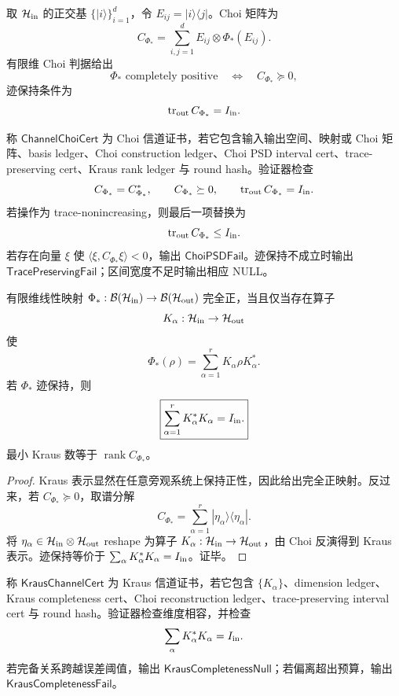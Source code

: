 取 \(\mathcal H_{\rm in}\) 的正交基 \(\{|i\rangle\}_{i=1}^d\)，令 \(E_{ij}=|i\rangle\langle j|\)。Choi 矩阵为
\[
\boxed{
C_{\Phi_{\ast}}
=
\sum_{i,j=1}^{d}
E_{ij}\otimes\Phi_{\ast}(E_{ij}).
}
\]
有限维 Choi 判据给出
\[
\Phi_{\ast}\text{ completely positive}
\quad\Longleftrightarrow\quad
C_{\Phi_{\ast}}\succeq0,
\]
迹保持条件为
\[
\operatorname{tr}_{\rm out} C_{\Phi_{\ast}}=I_{\rm in}.
\]

\begin{definition}\label{def:typed-address-biaxial-completion-channel-choi-cert}
称 \(\mathsf{ChannelChoiCert}\) 为 Choi 信道证书，若它包含输入输出空间、映射或 Choi 矩阵、basis ledger、Choi construction ledger、Choi PSD interval cert、trace-preserving cert、Kraus rank ledger 与 round hash。验证器检查
\[
C_{\Phi_{\ast}}=C_{\Phi_{\ast}}^*,
\qquad
C_{\Phi_{\ast}}\succeq0,
\qquad
\operatorname{tr}_{\rm out}C_{\Phi_{\ast}}=I_{\rm in}.
\]
若操作为 trace-nonincreasing，则最后一项替换为
\[
\operatorname{tr}_{\rm out}C_{\Phi_{\ast}}\le I_{\rm in}.
\]
若存在向量 \(\xi\) 使 \(\langle\xi,C_{\Phi_{\ast}}\xi\rangle<0\)，输出 \(\mathsf{ChoiPSDFail}\)。迹保持不成立时输出 \(\mathsf{TracePreservingFail}\)；区间宽度不足时输出相应 NULL。
\end{definition}

\begin{theorem}[Kraus 表示]\label{thm:typed-address-biaxial-completion-kraus-representation}
有限维线性映射 \(\Phi_{\ast}:\mathcal B(\mathcal H_{\rm in})\to\mathcal B(\mathcal H_{\rm out})\) 完全正，当且仅当存在算子
\[
K_\alpha:\mathcal H_{\rm in}\to\mathcal H_{\rm out}
\]
使
\[
\boxed{
\Phi_{\ast}(\rho)=
\sum_{\alpha=1}^{r}K_\alpha\rho K_\alpha^*.
}
\]
若 \(\Phi_{\ast}\) 迹保持，则
\[
\boxed{
\sum_{\alpha=1}^{r}K_\alpha^*K_\alpha=I_{\rm in}.
}
\]
最小 Kraus 数等于 \(\operatorname{rank}C_{\Phi_{\ast}}\)。
\end{theorem}
\begin{proof}
Kraus 表示显然在任意旁观系统上保持正性，因此给出完全正映射。反过来，若 \(C_{\Phi_{\ast}}\succeq0\)，取谱分解
\[
C_{\Phi_{\ast}}=\sum_{\alpha=1}^{r}|\eta_\alpha\rangle\langle\eta_\alpha|.
\]
将 \(\eta_\alpha\in\mathcal H_{\rm in}\otimes\mathcal H_{\rm out}\) reshape 为算子 \(K_\alpha:\mathcal H_{\rm in}\to\mathcal H_{\rm out}\)，由 Choi 反演得到 Kraus 表示。迹保持等价于 \(\sum_\alpha K_\alpha^*K_\alpha=I_{\rm in}\)。证毕。
\end{proof}

\begin{definition}\label{def:typed-address-biaxial-completion-kraus-channel-cert}
称 \(\mathsf{KrausChannelCert}\) 为 Kraus 信道证书，若它包含 \(\{K_\alpha\}\)、dimension ledger、Kraus completeness cert、Choi reconstruction ledger、trace-preserving interval cert 与 round hash。验证器检查维度相容，并检查
\[
\sum_\alpha K_\alpha^*K_\alpha=I_{\rm in}.
\]
若完备关系跨越误差阈值，输出 \(\mathsf{KrausCompletenessNull}\)；若偏离超出预算，输出 \(\mathsf{KrausCompletenessFail}\)。
\end{definition}

